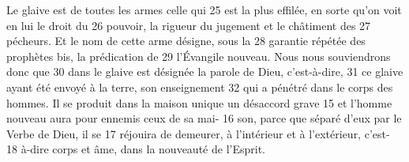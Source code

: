 Le glaive est de toutes les armes celle qui	 
25	 	est la plus effilée, en sorte qu'on voit en lui le droit du	 
26	 	pouvoir, la rigueur du jugement et le châtiment des	 
27	 	pécheurs. Et le nom de cette arme désigne, sous la	 
28	 	garantie répétée des prophètes bis, la prédication de	 
29	 	l'Évangile nouveau. Nous nous souviendrons donc que	 
30	 	dans le glaive est désignée la parole de Dieu, c'est-à-dire,	 
31	 	ce glaive ayant été envoyé à la terre, son enseignement	 
32	 	qui a pénétré dans le corps des hommes.
Il se produit dans la maison unique un désaccord grave	 
15	 	et l'homme nouveau aura pour ennemis ceux de sa mai-	 
16	 	son, parce que séparé d'eux par le Verbe de Dieu, il se	 
17	 	réjouira de demeurer, à l'intérieur et à l'extérieur, c'est-	 
18	 	à-dire corps et âme, dans la nouveauté de l'Esprit.